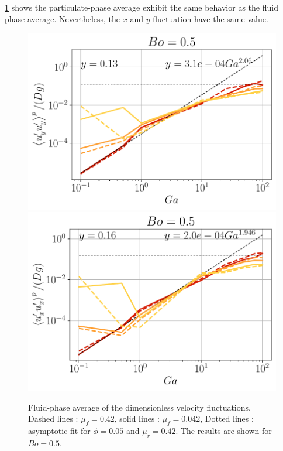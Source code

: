 \ref{fig:UUp} shows the particulate-phase average exhibit the same behavior as the fluid phase average. 
Nevertheless, the $x$ and $y$ fluctuation have the same value.
\begin{figure}[h!]
    \centering
    \includegraphics[height=0.22\textheight]{image/N_10/UU/UU_pyy_Bo_0_5.pdf}
    \includegraphics[height=0.22\textheight]{image/N_10/UU/UU_pxx_Bo_0_5.pdf}
    \caption{Fluid-phase average of the dimensionless velocity fluctuations. Dashed lines : $\mu_f = 0.42$, solid lines : $\mu_f = 0.042$, Dotted lines : asymptotic fit for $\phi = 0.05$ and $\mu_r = 0.42$. The results are shown for $Bo = 0.5$.} 
    \label{fig:UUp}
\end{figure} 

